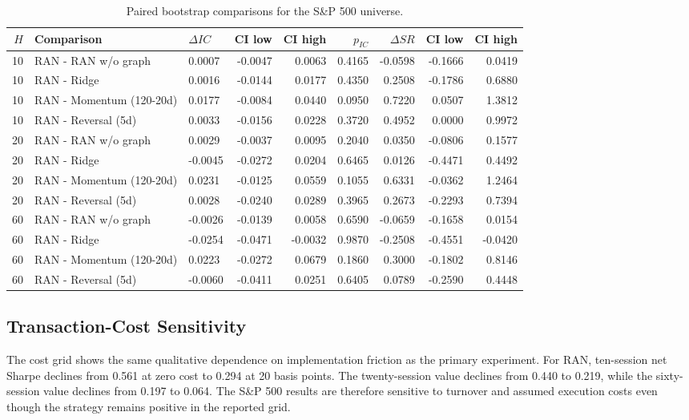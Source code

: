 \documentclass[10pt]{article}
\begin{document}
\begin{table}[tbp]
\centering\scriptsize
\caption{Paired bootstrap comparisons for the S\&P 500 universe.}
\label{tab:sp500paired}
\begin{tabular}{rllrrrrrr}
\toprule
$H$ & Comparison & $\Delta IC$ & CI low & CI high & $p_{IC}$ & $\Delta SR$ & CI low & CI high\\
\midrule
10 & RAN - RAN w/o graph & 0.0007 & -0.0047 & 0.0063 & 0.4165 & -0.0598 & -0.1666 & 0.0419 \\
10 & RAN - Ridge & 0.0016 & -0.0144 & 0.0177 & 0.4350 & 0.2508 & -0.1786 & 0.6880 \\
10 & RAN - Momentum (120-20d) & 0.0177 & -0.0084 & 0.0440 & 0.0950 & 0.7220 & 0.0507 & 1.3812 \\
10 & RAN - Reversal (5d) & 0.0033 & -0.0156 & 0.0228 & 0.3720 & 0.4952 & 0.0000 & 0.9972 \\
20 & RAN - RAN w/o graph & 0.0029 & -0.0037 & 0.0095 & 0.2040 & 0.0350 & -0.0806 & 0.1577 \\
20 & RAN - Ridge & -0.0045 & -0.0272 & 0.0204 & 0.6465 & 0.0126 & -0.4471 & 0.4492 \\
20 & RAN - Momentum (120-20d) & 0.0231 & -0.0125 & 0.0559 & 0.1055 & 0.6331 & -0.0362 & 1.2464 \\
20 & RAN - Reversal (5d) & 0.0028 & -0.0240 & 0.0289 & 0.3965 & 0.2673 & -0.2293 & 0.7394 \\
60 & RAN - RAN w/o graph & -0.0026 & -0.0139 & 0.0058 & 0.6590 & -0.0659 & -0.1658 & 0.0154 \\
60 & RAN - Ridge & -0.0254 & -0.0471 & -0.0032 & 0.9870 & -0.2508 & -0.4551 & -0.0420 \\
60 & RAN - Momentum (120-20d) & 0.0223 & -0.0272 & 0.0679 & 0.1860 & 0.3000 & -0.1802 & 0.8146 \\
60 & RAN - Reversal (5d) & -0.0060 & -0.0411 & 0.0251 & 0.6405 & 0.0789 & -0.2590 & 0.4448 \\
\bottomrule
\end{tabular}
\end{table}

\subsection{Transaction-Cost Sensitivity}

The cost grid shows the same qualitative dependence on implementation friction as the primary experiment. For RAN, ten-session net Sharpe declines from 0.561 at zero cost to 0.294 at 20 basis points. The twenty-session value declines from 0.440 to 0.219, while the sixty-session value declines from 0.197 to 0.064. The S\&P 500 results are therefore sensitive to turnover and assumed execution costs even though the strategy remains positive in the reported grid.
\end{document}
